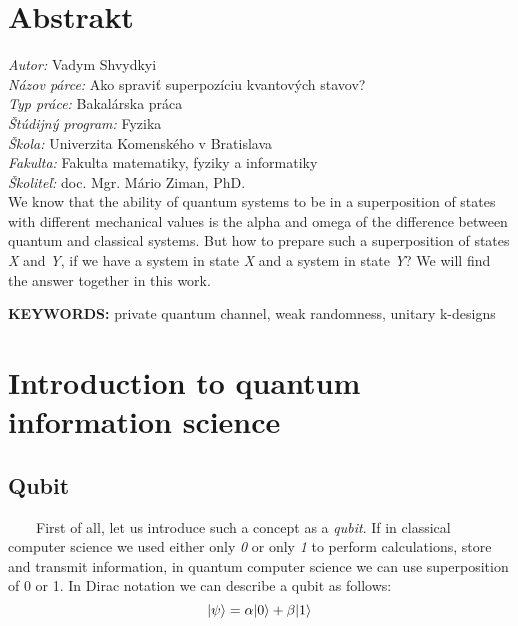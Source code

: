 \documentclass[english,14pt,a4paper]{article}
\begin{document}
	\begin{spacing}{1.5}
	\section*{Abstrakt}
	\begin{spacing}{1.5}
		\textit{Autor:} Vadym Shvydkyi \\
		\textit{Názov párce:} Ako spraviť superpozíciu kvantových stavov? \\
		\textit{Typ práce:} Bakalárska práca \\
		\textit{Štúdijný program:} Fyzika \\
		\textit{Škola:} Univerzita Komenského v Bratislava \\
		\textit{Fakulta:} Fakulta matematiky, fyziky a informatiky \\
		\textit{Školiteľ:} doc. Mgr. Mário Ziman, PhD. \\
		
		We know that the ability of quantum systems to be in a superposition of states with different mechanical values is the alpha and omega of the difference between quantum and classical systems. But how to prepare such a superposition of states \textit{X} and \textit{Y}, if we have a system in state \textit{X} and a system in state \textit{Y}? We will find the answer together in this work.
		
		\textbf{KEYWORDS:} private quantum channel, weak randomness, unitary k-designs
		\pagebreak
	\end{spacing}
	
	\tableofcontents
	\pagebreak
	\section{Introduction to quantum information science}
	\subsection{Qubit} \ \ \ \
	First of all, let us introduce such a concept as a \textit{qubit}. If in classical computer science we used either only \textit{0} or only \textit{1} to perform calculations, store and transmit information, in quantum computer science we can use superposition of 0 or 1. In Dirac notation we can describe a qubit as follows:
	\begin{equation}
		\ket{\psi}  = \alpha | 0 \rangle + \beta | 1 \rangle
	\end{equation}
	

\end{spacing}
\end{document}

